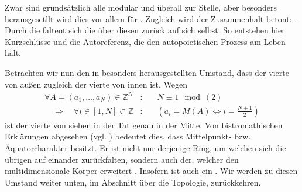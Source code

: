 \begin{newstuff}
    Zwar sind grundsätzlich alle  modular und überall zur Stelle, aber besonders herausgesetllt wird dies vor allem für . Zugleich wird der Zusammenhalt betont: .
    Durch die  faltent sich die  über diesen  zurück auf sich selbst. So entstehen hier Kurzschlüsse und die Autoreferenz, die den autopoietischen Prozess am Leben hält. 

    Betrachten wir nun den in  besonders herausgestellten Umstand, dass der vierte  von außen zugleich der vierte von innen ist. Wegen
        \begin{equation}
        \begin{array}{rcl}
            \forall A = (a_1,\ldots,a_N) \in \mathbb{Z}^N&:&
            \quad
            N\equiv 1\mod(2)\\
            \quad\Rightarrow\quad
            \forall i \in [1,N] \subset \mathbb{Z}&:&
            \quad
            \left(
            a_i = M(A) \Leftrightarrow i = \frac{N+1}{2}
            \right)
        \end{array}
        \end{equation}
    ist der vierte  von sieben in der Tat genau in der Mitte.
    Von bistromathischen  Erklärungen abgesehen (vgl. \cite[Kap. 4]{adams_life})  bedeutet dies, dass   Mittelpunkt- bzw. Äquatorcharakter besitzt. 
    Er ist nicht nur derjenige Ring, um welchen sich die übrigen  auf einander zurückfalten, sondern auch der, welcher den multidimensionale Körper erweitert . Insofern ist  auch ein . Wir werden zu diesen Umstand weiter unten, im Abschnitt über die Topologie, zurückkehren.
\end{newstuff}